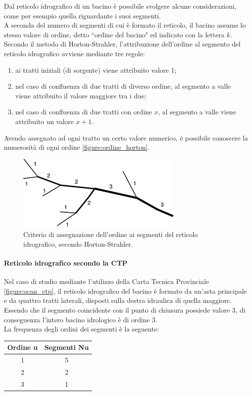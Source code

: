 Dal reticolo idrografico di un bacino è possibile svolgere alcune considerazioni, come per esempio quella riguardante i suoi segmenti.\\
A seconda del numero di segmenti di cui è formato il reticolo, il bacino assume lo stesso valore di ordine, detto ``ordine del bacino" ed indicato con la lettera $k$.\\
Secondo il metodo di Horton-Strahler, l'attribuzione dell'ordine al segmento del reticolo idrografico avviene mediante tre regole: 
\begin{enumerate}
    \item ai tratti iniziali (di sorgente) viene attribuito valore 1;
    \item nel caso di confluenza di due tratti di diverso ordine, al segmento a valle viene attribuito il valore maggiore tra i due;
    \item nel caso di confluenza di due tratti con ordine $x$, al segmento a valle viene attribuito un valore $x+1$.
\end{enumerate} 
Avendo assegnato ad ogni tratto un certo valore numerico, è possibile conoscere la numerosità di ogni ordine \eqref{figure:ordine_horton}.
\begin{figure}[hbt]\centering
    \includegraphics[scale=.75]{immagini/ordine_horton.png}
    \caption{Criterio di assegnazione dell'ordine ai segmenti del reticolo idrografico, secondo Horton-Strahler.}
  \label{figure:ordine_horton}
\end{figure}
 
\paragraph{Reticolo idrografico secondo la CTP}
Nel caso di studio mediante l'utilizzo della Carta Tecnica Provinciale \eqref{figure:scan_ctp}, il reticolo idrografico del bacino è formato da un'asta principale e da quattro tratti laterali, disposti sulla destra idraulica di quella maggiore.\\
Essendo che il segmento coincidente con il punto di chiusura possiede valore 3, di conseguenza l'intero bacino idrologico è di ordine 3.\\
La frequenza degli ordini dei segmenti è la seguente:
\begin{table}[H] \centering
    \begin{tabular}{cc}
\toprule
    Ordine u & Segmenti Nu \\
\midrule    
    1        & 5           \\
    2        & 2           \\
    3        & 1           \\
\bottomrule    
\end{tabular}
\end{table}
